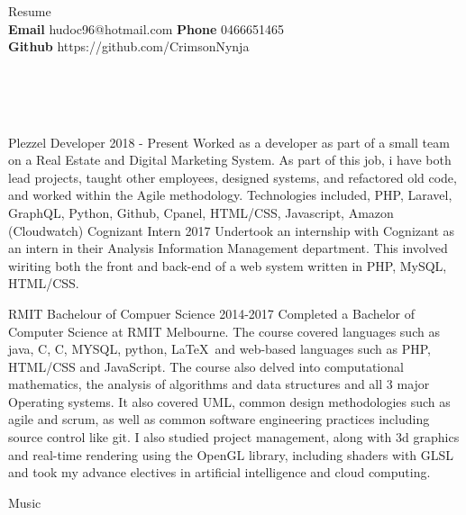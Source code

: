 \documentclass[9pt]{developercv}
\newcommand{\CC}{C\nolinebreak\hspace{-.05em}\raisebox{.4ex}{\tiny\bf +}\nolinebreak\hspace{-.10em}\raisebox{.4ex}{\tiny\bf +}}
\def\CC{{C\nolinebreak[4]\hspace{-.05em}\raisebox{.4ex}{\tiny\bf ++}}}
\begin{document}
	\begin{minipage}[a]{1.0\textwidth}
		\begin{center}
			{\HUGE Resume}\\ 
			\textbf {Email} hudoc96@hotmail.com
			\textbf {Phone} 0466651465 \\
			\textbf {Github} https://github.com/CrimsonNynja \\
		\end{center}
	\end{minipage}
	\\
	\\
	\\
	\begin{minipage}[t]{0.6\textwidth}
		\begin{entrylist}
			\entry
				{Plezzel}
				{Developer}
				{2018 - Present}
				{Worked as a developer as part of a small team on a Real Estate and Digital Marketing System. As part of this job, i have both lead projects, taught other employees, designed systems, and refactored old code, and worked within the Agile methodology. Technologies included, PHP, Laravel, GraphQL, Python, Github, Cpanel, HTML/CSS, Javascript, Amazon (Cloudwatch)}
			\entry
				{Cognizant}
				{Intern}
				{2017}
				{Undertook an internship with Cognizant as an intern in their Analysis Information Management department. This involved wiriting both the front and back-end of a web system written in PHP, MySQL, HTML/CSS.}
		\end{entrylist}	
		\cvsect{Education}
		\begin{entrylist}
			\entry
				{RMIT}
				{Bachelour of Compuer Science}
				{2014-2017}
				{Completed a Bachelor of Computer Science at RMIT Melbourne. The course covered languages such as java, C, \CC, MYSQL, python, \LaTeX  \  and web-based languages such as PHP, HTML/CSS and JavaScript. The course also delved into computational mathematics, the analysis of algorithms and data structures and all 3 major Operating systems. It also covered UML, common design methodologies such as agile and scrum, as well as common software engineering practices including source control like git. I also studied project management, along with 3d graphics and real-time rendering using the OpenGL library, including shaders with GLSL and took my advance electives in artificial intelligence and cloud computing.}
		\end{entrylist}
		\cvsect{Hobbies}
		\begin{entrylist}
			\entry
				{\vphantom{1.0}}
				{Music}

\end{entrylist}
\end{minipage}
\end{document}
